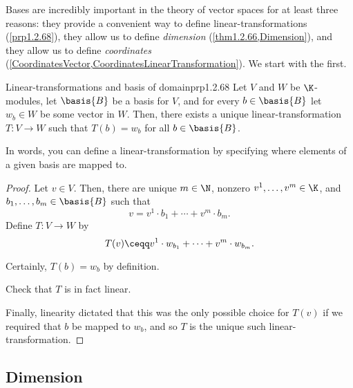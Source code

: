 Bases are incredibly important in the theory of vector spaces for at least three reasons:  they provide a convenient way to define linear-transformations (\cref{prp1.2.68}), they allow us to define \emph{dimension} (\cref{thm1.2.66,Dimension}), and they allow us to define \emph{coordinates} (\cref{CoordinatesVector,CoordinatesLinearTransformation}).  We start with the first.
\begin{thm}{Linear-transformations and basis of domain}{prp1.2.68}
	Let $V$ and $W$ be $\K$-modules, let $\basis{B}$ be a basis for $V$, and for every $b\in \basis{B}$ let $w_b\in W$ be some vector in $W$.  Then, there exists a unique linear-transformation $T\colon V\rightarrow W$ such that $T(b)=w_b$ for all $b\in \basis{B}$.
	\begin{rmk}
		In words, you can define a linear-transformation by specifying where elements of a given basis are mapped to.
	\end{rmk}
	\begin{proof}
		Let $v\in V$.  Then, there are unique $m\in \N$, nonzero $v^1,\ldots ,v^m\in \K$, and $b_1,\ldots ,b_m\in \basis{B}$ such that
		\begin{equation}
			v=v^1\cdot b_1+\cdots +v^m\cdot b_m.
		\end{equation}
		Define $T\colon V\rightarrow W$ by
		\begin{equation}
			T(v)\ceqq v^1\cdot w_{b_1}+\cdots +v^m\cdot w_{b_m}.
		\end{equation}
		
		Certainly, $T(b)=w_b$ by definition.
		\begin{exr}[breakable=false]{}{}
			Check that $T$ is in fact linear.		
		\end{exr}
		Finally, linearity dictated that this was the only possible choice for $T(v)$ if we required that $b$ be mapped to $w_b$, and so $T$ is the unique such linear-transformation.
	\end{proof}
\end{thm}

\subsection{Dimension}

